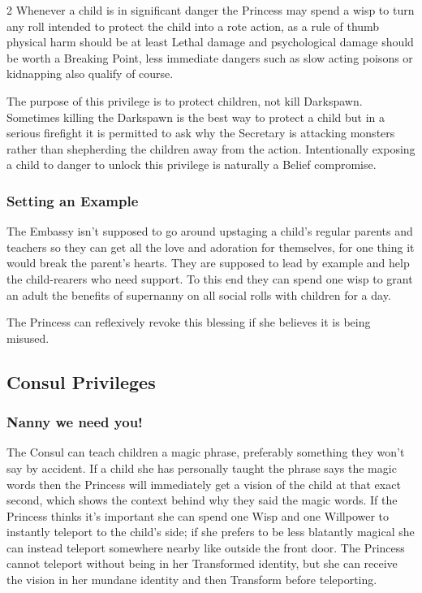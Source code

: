 \begin{multicols}{2}
Whenever a child is in significant danger the Princess may spend a wisp to turn any roll intended to protect the child into a rote action, as a rule of thumb physical harm should be at least Lethal damage and psychological damage should be worth a Breaking Point, less immediate dangers such as slow acting poisons or kidnapping also qualify of course.

The purpose of this privilege is to protect children, not kill Darkspawn. Sometimes killing the Darkspawn is the best way to protect a child but in a serious firefight it is permitted to ask why the Secretary is attacking monsters rather than shepherding the children away from the action. Intentionally exposing a child to danger to unlock this privilege is naturally a Belief compromise.

\subsubsection*{Setting an Example}

The Embassy isn't supposed to go around upstaging a child's regular parents and teachers so they can get all the love and adoration for themselves, for one thing it would break the parent's hearts. They are supposed to lead by example and help the child-rearers who need support. To this end they can spend one wisp to grant an adult the benefits of supernanny on all social rolls with children for a day. 

The Princess can reflexively revoke this blessing if she believes it is being misused. 

\subsection*{Consul Privileges}

\subsubsection*{Nanny we need you!}

The Consul can teach children a magic phrase, preferably something they won't say by accident. If a child she has personally taught the phrase says the magic words then the Princess will immediately get a vision of the child at that exact second, which shows the context behind why they said the magic words. If the Princess thinks it's important she can spend one Wisp and one Willpower to instantly teleport to the child's side; if she prefers to be less blatantly magical she can instead teleport somewhere nearby like outside the front door. The Princess cannot teleport without being in her Transformed identity, but she can receive the vision in her mundane identity and then Transform before teleporting.


\end{multicols}
